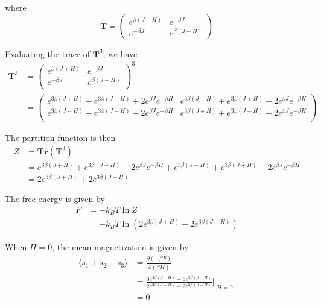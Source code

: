 \documentclass[11pt]{article}
\begin{document}
where 
\begin{equation}
    \mathbf{T} = \begin{pmatrix}
        e^{\beta(J + H)} & e^{-\beta J} \\
        e^{-\beta J} & e^{\beta(J - H)}
    \end{pmatrix}
\end{equation}

Evaluating the trace of $\mathbf{T}^3$, we have 
\begin{align*}
    \mathbf{T}^3 &= \begin{pmatrix}
        e^{\beta(J + H)} & e^{-\beta J} \\
        e^{-\beta J} & e^{\beta(J - H)} \\
    \end{pmatrix}^3 \\
    &= \begin{pmatrix}
        e^{3\beta(J + H)} + e^{3\beta(J - H)} + 2e^{\beta J}e^{-\beta H} & e^{3\beta(J - H)} + e^{3\beta(J + H)} - 2e^{\beta J}e^{-\beta H} \\
        e^{3\beta(J - H)} + e^{3\beta(J + H)} - 2e^{\beta J}e^{-\beta H} & e^{3\beta(J + H)} + e^{3\beta(J - H)} + 2e^{\beta J}e^{-\beta H}\\
    \end{pmatrix}
\end{align*}

The partition function is then
\begin{align*}
    Z &= \mathbf{Tr}(\mathbf{T}^3) \\
      &= e^{3\beta(J + H)} + e^{3\beta(J - H)} + 2e^{\beta J}e^{-\beta H} + e^{3\beta(J - H)} + e^{3\beta(J + H)} - 2e^{\beta J}e^{-\beta H} \\
      &= 2e^{3\beta(J + H)} + 2e^{3\beta(J - H)}
\end{align*}

The free energy is given by
\begin{align*}
    F &= -k_B T \ln Z \\
      &= -k_B T \ln \left(2e^{3\beta(J + H)} + 2e^{3\beta(J - H)}\right)
\end{align*}

When $H = 0$, the mean magnetization is given by
\begin{align*}
    \langle s_1 + s_2 + s_3 \rangle 
    &= \frac{\partial (-\beta F)}{\partial (\beta H)}\\
    &= \frac{6e^{3\beta(J + H)} - 6e^{3\beta(J - H)}}{2e^{3\beta(J + H)} + 2e^{3\beta(J - H)}}\biggr|_{\substack{H=0}} \\
    &= 0
\end{align*}
\end{document}
